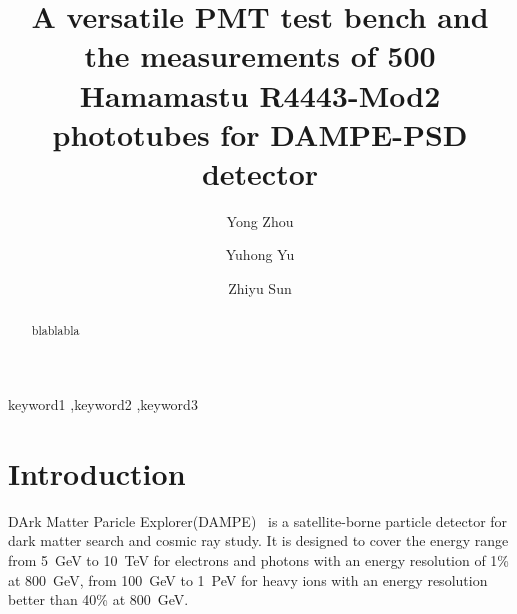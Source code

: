\documentclass[5p, times]{elsarticle}
\begin{document}
\begin{frontmatter}

\title{A versatile PMT test bench and the measurements of 500 Hamamastu R4443-Mod2 phototubes for DAMPE-PSD detector}

\author[imp, ucas, lzu]{Yong Zhou}

\author[imp]{Yuhong Yu}

\author[imp]{Zhiyu Sun}


\address[imp]{Institute of Modern Physicas, Chinese Academy of Sciences,  509 Nanchang Road,  Lanzhou,  730000,  P.R.China}
\address[ucas]{Graduate University of the Chinese Academy of Sciences,  19A Yuquan Road,  Beijing,  100049,  P.R.China}
\address[lzu]{School of Nuclear Science and Technology,  Lanzhou University,  222 South Tianshui Road,  Lanzhou,  730000,  P.R.China}

\begin{abstract}
blablabla
\end{abstract}

\begin{keyword}
keyword1
\sep keyword2
\sep keyword3



\end{keyword}

\end{frontmatter}

\section{Introduction}
\label{sec:introduction}

DArk Matter Paricle Explorer(DAMPE)~\cite{Chang_Jin_dampe} is a satellite-borne particle detector for dark matter search and cosmic ray study.
It is designed to cover the energy range from 5~GeV to 10~TeV for electrons and photons with an energy resolution of 1\% at 800~GeV, from 100~GeV to 1~PeV for heavy ions with an energy resolution better than 40\% at 800~GeV.
\end{document}
